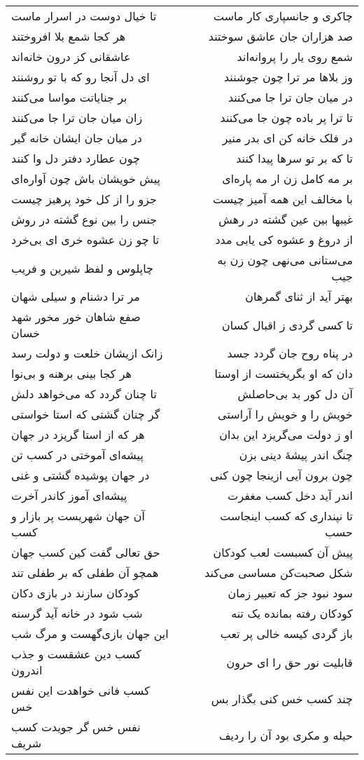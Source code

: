 \begin{center}
\begin{longtable}{l p{0.5cm} r}
تا خیال دوست در اسرار ماست
&&
چاکری و جانسپاری کار ماست
\\
هر کجا شمع بلا افروختند
&&
صد هزاران جان عاشق سوختند
\\
عاشقانی کز درون خانه‌اند
&&
شمع روی یار را پروانه‌اند
\\
ای دل آنجا رو که با تو روشنند
&&
وز بلاها مر ترا چون جوشنند
\\
بر جنایاتت مواسا می‌کنند
&&
در میان جان ترا جا می‌کنند
\\
زان میان جان ترا جا می‌کنند
&&
تا ترا پر باده چون جا می‌کنند
\\
در میان جان ایشان خانه گیر
&&
در فلک خانه کن ای بدر منیر
\\
چون عطارد دفتر دل وا کنند
&&
تا که بر تو سرها پیدا کنند
\\
پیش خویشان باش چون آواره‌ای
&&
بر مه کامل زن ار مه پاره‌ای
\\
جزو را از کل خود پرهیز چیست
&&
با مخالف این همه آمیز چیست
\\
جنس را بین نوع گشته در روش
&&
غیبها بین عین گشته در رهش
\\
تا چو زن عشوه خری ای بی‌خرد
&&
از دروغ و عشوه کی یابی مدد
\\
چاپلوس و لفظ شیرین و فریب
&&
می‌ستانی می‌نهی چون زن به جیب
\\
مر ترا دشنام و سیلی شهان
&&
بهتر آید از ثنای گمرهان
\\
صفع شاهان خور مخور شهد خسان
&&
تا کسی گردی ز اقبال کسان
\\
زانک ازیشان خلعت و دولت رسد
&&
در پناه روح جان گردد جسد
\\
هر کجا بینی برهنه و بی‌نوا
&&
دان که او بگریختست از اوستا
\\
تا چنان گردد که می‌خواهد دلش
&&
آن دل کور بد بی‌حاصلش
\\
گر چنان گشتی که استا خواستی
&&
خویش را و خویش را آراستی
\\
هر که از استا گریزد در جهان
&&
او ز دولت می‌گریزد این بدان
\\
پیشه‌ای آموختی در کسب تن
&&
چنگ اندر پیشهٔ دینی بزن
\\
در جهان پوشیده گشتی و غنی
&&
چون برون آیی ازینجا چون کنی
\\
پیشه‌ای آموز کاندر آخرت
&&
اندر آید دخل کسب مغفرت
\\
آن جهان شهریست پر بازار و کسب
&&
تا نپنداری که کسب اینجاست حسب
\\
حق تعالی گفت کین کسب جهان
&&
پیش آن کسبست لعب کودکان
\\
همچو آن طفلی که بر طفلی تند
&&
شکل صحبت‌کن مساسی می‌کند
\\
کودکان سازند در بازی دکان
&&
سود نبود جز که تعبیر زمان
\\
شب شود در خانه آید گرسنه
&&
کودکان رفته بمانده یک تنه
\\
این جهان بازی‌گهست و مرگ شب
&&
باز گردی کیسه خالی پر تعب
\\
کسب دین عشقست و جذب اندرون
&&
قابلیت نور حق را ای حرون
\\
کسب فانی خواهدت این نفس خس
&&
چند کسب خس کنی بگذار بس
\\
نفس خس گر جویدت کسب شریف
&&
حیله و مکری بود آن را ردیف
\\
\end{longtable}
\end{center}

